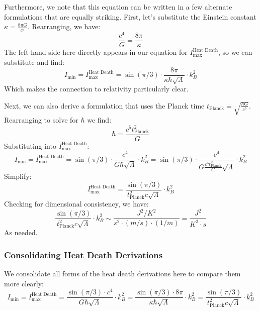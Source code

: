 \documentclass[12pt]{article}
\begin{document}
Furthermore, we note that this equation can be written in a few alternate formulations that are equally striking. First, let's substitute the Einstein constant $\kappa = \frac{8 \pi G}{c^4}$. Rearranging, we have:
\begin{equation}
    \frac{c^4}{G} = \frac{8 \pi}{\kappa}
\end{equation}
The left hand side here directly appears in our equation for $I_\text{max}^{\text{Heat Death}}$, so we can substitute and find:
\begin{equation}
    \boxed{I_\text{min} = I_\text{max}^{\text{Heat Death}} = \sin(\pi / 3) \cdot \frac{8\pi}{\kappa \hbar \sqrt{\Lambda}} \cdot k_B^2}
\end{equation}
Which makes the connection to relativity particularly clear.

Next, we can also derive a formulation that uses the Planck time $t_\text{Planck} = \sqrt{\frac{\hbar G}{c^5}}$. Rearranging to solve for $\hbar$ we find:
\begin{equation}
    \hbar = \frac{c^5 t_\text{Planck}^2}{G}
\end{equation}
Substituting into $I_\text{max}^{\text{Heat Death}}$:
\begin{equation}
    I_\text{min} = I_\text{max}^{\text{Heat Death}} = \sin(\pi / 3) \cdot \frac{c^4}{G \hbar \sqrt{\Lambda}} \cdot k_B^2 = \sin(\pi / 3) \cdot \frac{c^4}{G \frac{c^5 t_\text{Planck}^2}{G} \sqrt{\Lambda}} \cdot k_B^2
\end{equation}
Simplify:
\begin{equation}
    \boxed{I_\text{max}^{\text{Heat Death}} = \frac{\sin(\pi / 3)}{t_\text{Planck}^2 c \sqrt{\Lambda}} \cdot k_B^2}
\end{equation}
Checking for dimensional consistency, we have:
\begin{equation}
    \frac{\sin(\pi / 3)}{t_\text{Planck}^2 c \sqrt{\Lambda}} \cdot k_B^2 \sim \frac{J^2/K^2}{s^2 \cdot (m/s) \cdot (1/m)} = \frac{J^2}{K^2 \cdot s}
\end{equation}
As needed.

\subsubsection{Consolidating Heat Death Derivations}
We consolidate all forms of the heat death derivations here to compare them more clearly:
\begin{equation}
    \boxed{I_\text{min} = I_\text{max}^{\text{Heat Death}} = \frac{\sin(\pi / 3) \cdot c^4}{G \hbar \sqrt{\Lambda}} \cdot k_B^2 = \frac{\sin(\pi / 3) \cdot 8\pi}{\kappa \hbar \sqrt{\Lambda}} \cdot k_B^2 = \frac{\sin(\pi / 3)}{t_\text{Planck}^2 c \sqrt{\Lambda}} \cdot k_B^2}
\end{equation}
\end{document}

